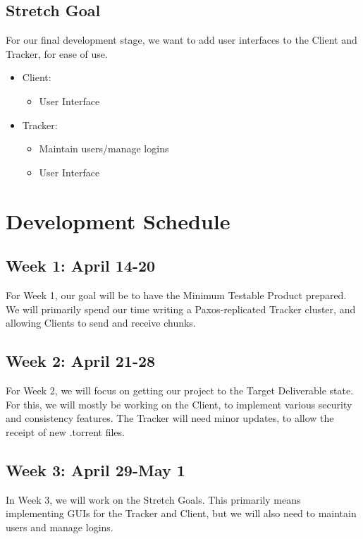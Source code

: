 \documentclass[12pt]{article}
\begin{document}
\subsection*{Stretch Goal}
For our final development stage, we want to add user interfaces to the Client
and Tracker, for ease of use.

\begin{itemize}
\item  Client:
    \begin{itemize}
    \item  User Interface
    \end{itemize}
\item  Tracker:
    \begin{itemize}
    \item  Maintain users/manage logins
    \item  User Interface
    \end{itemize}
\end{itemize}

\section*{Development Schedule}

\subsection*{Week 1: April 14-20}
For Week 1, our goal will be to have the Minimum Testable Product prepared.
We will primarily spend our time writing a Paxos-replicated Tracker cluster,
and allowing Clients to send and receive chunks.

\subsection*{Week 2: April 21-28}
For Week 2, we will focus on getting our project to the Target Deliverable state.
For this, we will mostly be working on the Client, to implement various security
and consistency features.
The Tracker will need minor updates, to allow the receipt of new .torrent files.

\subsection*{Week 3: April 29-May 1}
In Week 3, we will work on the Stretch Goals.
This primarily means implementing GUIs for the Tracker and Client,
but we will also need to maintain users and manage logins.
\end{document}
